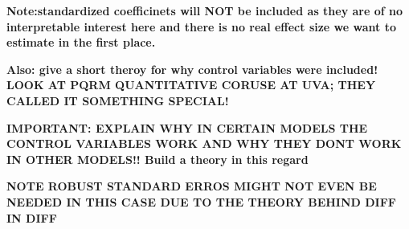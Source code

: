 \documentclass[a4paper]{article}
\begin{document}
\textbf{Note:standardized coefficinets will NOT be included as they are of no interpretable interest here and there is no real effect size we want to estimate in the first place.}

\textbf{Also: give a short theroy for why control variables were included! LOOK AT PQRM QUANTITATIVE CORUSE AT UVA; THEY CALLED IT SOMETHING SPECIAL!}

\textbf{IMPORTANT: EXPLAIN WHY IN CERTAIN MODELS THE CONTROL VARIABLES WORK AND WHY THEY DONT WORK IN OTHER MODELS!! Build a theory in this regard }

\textbf{NOTE ROBUST STANDARD ERROS MIGHT NOT EVEN BE NEEDED IN THIS CASE DUE TO THE THEORY BEHIND DIFF IN DIFF }


\pagebreak

\end{document}
